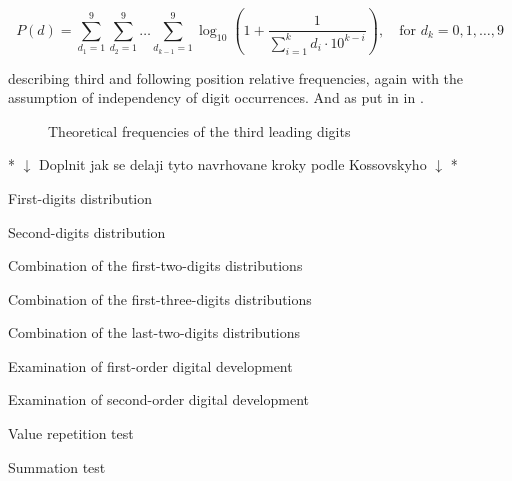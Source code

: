 \begin{equation}
    P(d) = \sum\limits_{d_1=1}^{9} \sum\limits_{d_2=1}^{9} \dots \sum\limits_{d_{k-1}=1}^{9}   \log_{10}\left( 1+\frac{1}{\sum\limits_{i=1}^{k} d_i \cdot 10^{k-i} }\right), \quad \text{for } d_k = 0,1,\dots,9 
\end{equation}

describing third and following position relative frequencies, again with the assumption of independency of digit occurrences. And  as put in \citeauthor{Hronova2023} in \citeyear{Hronova2023}. 

\begin{figure}[h]
    \centering
    \caption{Theoretical frequencies of the third leading digits}  
    \label{fig:third-digit-law}
    \pgfplotsset{width=8.5cm,compat=1.18}
\end{figure}

\begin{koment}
* $\downarrow$ Doplnit jak se delaji tyto navrhovane kroky podle Kossovskyho $\downarrow$ *

First-digits distribution

Second-digits distribution

Combination of the first-two-digits distributions

Combination of the first-three-digits distributions

Combination of the last-two-digits distributions 

Examination of first-order digital development

Examination of second-order digital development

Value repetition test

Summation test  
\end{koment}



